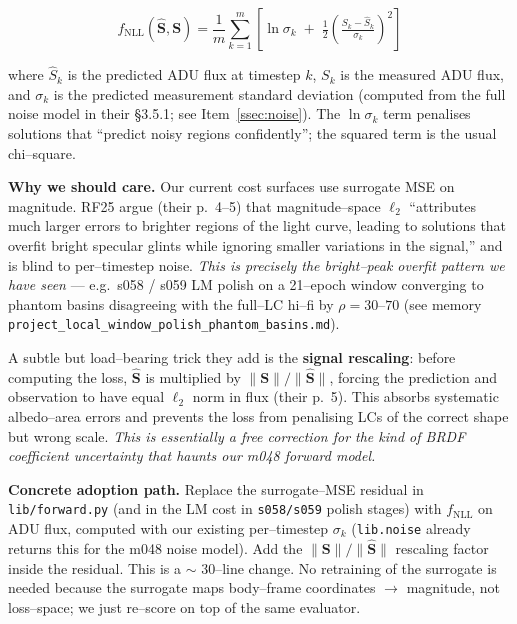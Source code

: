 \documentclass[11pt]{article}
\newcommand{\NLL}{f_{\mathrm{NLL}}}
\newcommand{\ttt}[1]{\texttt{#1}}
\begin{document}
\begin{equation}
\label{eq:rf_nll}
\NLL(\hat{\mathbf{S}}, \mathbf{S})
= \frac{1}{m} \sum_{k=1}^{m}
\left[
\ln \sigma_k \;+\; \tfrac{1}{2} \left( \tfrac{S_k - \hat{S}_k}{\sigma_k} \right)^2
\right]
\end{equation}

\noindent
where $\hat{S}_k$ is the predicted ADU flux at timestep $k$, $S_k$ is the
measured ADU flux, and $\sigma_k$ is the predicted measurement standard
deviation (computed from the full noise model in their \S3.5.1; see Item~\ref{ssec:noise}).
The $\ln \sigma_k$ term penalises solutions that ``predict noisy regions
confidently''; the squared term is the usual chi--square.

\textbf{Why we should care.} Our current cost surfaces use surrogate MSE on
magnitude. RF25 argue (their p.~4--5) that magnitude--space $\ell_2$ ``attributes
much larger errors to brighter regions of the light curve, leading to solutions
that overfit bright specular glints while ignoring smaller variations in the
signal,'' and is blind to per--timestep noise. \emph{This is precisely the bright--peak
overfit pattern we have seen} --- e.g.\ s058 / s059 LM polish on a 21--epoch
window converging to phantom basins disagreeing with the full--LC hi--fi by
$\rho = 30$--$70$ (see memory \ttt{project\_local\_window\_polish\_phantom\_basins.md}).

A subtle but load--bearing trick they add is the \textbf{signal rescaling}: before
computing the loss, $\hat{\mathbf{S}}$ is multiplied by
$\|\mathbf{S}\| / \|\hat{\mathbf{S}}\|$, forcing the prediction and observation
to have equal $\ell_2$ norm in flux (their p.~5).
This absorbs systematic albedo--area errors and prevents the loss from
penalising LCs of the correct shape but wrong scale. \textit{This is essentially
a free correction for the kind of BRDF coefficient uncertainty that haunts our
m048 forward model.}

\textbf{Concrete adoption path.} Replace the surrogate--MSE residual in
\ttt{lib/forward.py} (and in the LM cost in \ttt{s058/s059} polish stages)
with $\NLL$ on ADU flux, computed with our existing per--timestep $\sigma_k$
(\ttt{lib.noise} already returns this for the m048 noise model). Add the
$\|\mathbf{S}\|/\|\hat{\mathbf{S}}\|$ rescaling factor inside the residual.
This is a $\sim$ 30--line change. No retraining of the surrogate is needed
because the surrogate maps body--frame coordinates $\to$ magnitude, not
loss--space; we just re--score on top of the same evaluator.
\end{document}
